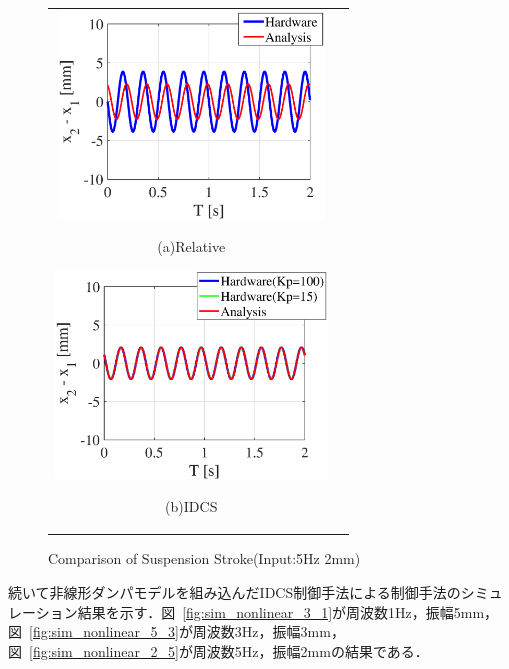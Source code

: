 \documentclass[a4paper,12pt]{article_vdlab_sotsuron}
\begin{document}
\newpage
\begin{figure}[h]
  \begin{tabular}{cc}
  \begin{minipage}{0.5\hsize}
  \begin{center}
    \includegraphics[height=55mm]{figure/sim_rela_2_5.eps}
    \end{center}
    \begin{center}
    \ (a)Relative\
    \end{center}
  \end{minipage}
  \begin{minipage}{0.5\hsize}
     \begin{center}
      \includegraphics[height=55mm]{figure/sim_linear_2_5.eps}
      \end{center}
      \begin{center}
      \ (b)IDCS\
    \end{center}
  \end{minipage}
  \end{tabular}
  \vspace*{2mm}
  \caption{Comparison of Suspension Stroke(Input:5Hz 2mm)}
  \label{fig:sim_2_5}
\end{figure}

\newpage
続いて非線形ダンパモデルを組み込んだIDCS制御手法による制御手法のシミュレーション結果を示す．図~\ref{fig:sim_nonlinear_3_1}が周波数1Hz，振幅5mm，図~\ref{fig:sim_nonlinear_5_3}が周波数3Hz，振幅3mm，図~\ref{fig:sim_nonlinear_2_5}が周波数5Hz，振幅2mmの結果である．
\end{document}
